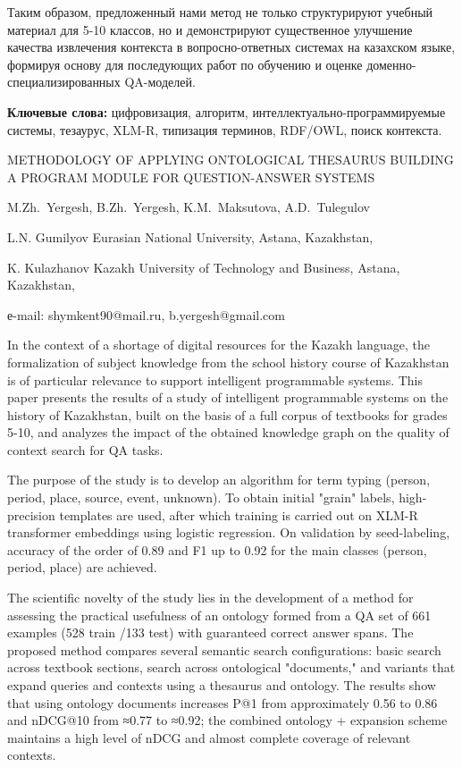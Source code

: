 Таким образом, предложенный нами метод не только структурируют учебный
материал для 5-10 классов, но и демонстрируют существенное улучшение
качества извлечения контекста в вопросно-ответных системах на казахском
языке, формируя основу для последующих работ по обучению и оценке
доменно-специализированных QA-моделей.

{\bfseries Ключевые слова:} цифровизация, алгоритм,
интеллектуально-программируемые системы, тезаурус, XLM-R, типизация
терминов, RDF/OWL, поиск контекста.

\begin{header}
METHODOLOGY OF APPLYING ONTOLOGICAL THESAURUS BUILDING A PROGRAM MODULE FOR QUESTION-ANSWER SYSTEMS

M.Zh.~Yergesh\envelope,
B.Zh.~Yergesh\envelope,
K.M.~Maksutova,
A.D.~Tulegulov
\end{header}

\begin{affil}
L.N. Gumilyov Eurasian National University, Astana, Kazakhstan,

K. Kulazhanov Kazakh University of Technology and Business, Astana, Kazakhstan,

е-mail: shymkent90@mail.ru, b.yergesh@gmail.com
\end{affil}

In the context of a shortage of digital resources for the Kazakh
language, the formalization of subject knowledge from the school history
course of Kazakhstan is of particular relevance to support intelligent
programmable systems. This paper presents the results of a study of
intelligent programmable systems on the history of Kazakhstan, built on
the basis of a full corpus of textbooks for grades 5-10, and analyzes
the impact of the obtained knowledge graph on the quality of context
search for QA tasks.

The purpose of the study is to develop an algorithm for term typing
(person, period, place, source, event, unknown). To obtain initial
"grain" labels, high-precision templates are used, after which training
is carried out on XLM-R transformer embeddings using logistic
regression. On validation by seed-labeling, accuracy of the order of
0.89 and F1 up to 0.92 for the main classes (person, period, place) are
achieved.

The scientific novelty of the study lies in the development of a method
for assessing the practical usefulness of an ontology formed from a QA
set of 661 examples (528 train /133 test) with guaranteed correct answer
spans. The proposed method compares several semantic search
configurations: basic search across textbook sections, search across
ontological "documents," and variants that expand queries and contexts
using a thesaurus and ontology. The results show that using ontology
documents increases P@1 from approximately 0.56 to 0.86 and nDCG@10 from
≈0.77 to ≈0.92; the combined ontology + expansion scheme maintains a
high level of nDCG and almost complete coverage of relevant contexts.

